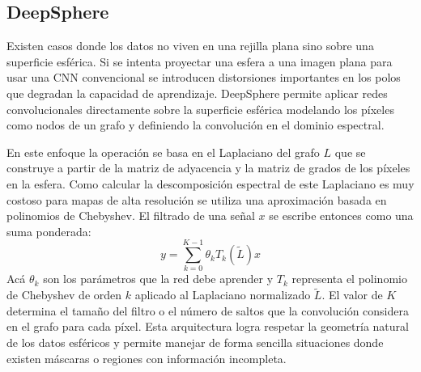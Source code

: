 \subsection{DeepSphere}
\label{subsec:deepsphere}

Existen casos donde los datos no viven en una rejilla plana sino sobre una superficie esférica. Si se intenta proyectar una esfera a una imagen plana para usar una CNN convencional se introducen distorsiones importantes en los polos que degradan la capacidad de aprendizaje. DeepSphere permite aplicar redes convolucionales directamente sobre la superficie esférica modelando los píxeles como nodos de un grafo y definiendo la convolución en el dominio espectral.

En este enfoque la operación se basa en el Laplaciano del grafo $L$ que se construye a partir de la matriz de adyacencia y la matriz de grados de los píxeles en la esfera. Como calcular la descomposición espectral de este Laplaciano es muy costoso para mapas de alta resolución se utiliza una aproximación basada en polinomios de Chebyshev. El filtrado de una señal $x$ se escribe entonces como una suma ponderada:
\begin{equation}
    y = \sum_{k=0}^{K-1} \theta_k T_k(\tilde{L})x
\end{equation}
Acá $\theta_k$ son los parámetros que la red debe aprender y $T_k$ representa el polinomio de Chebyshev de orden $k$ aplicado al Laplaciano normalizado $\tilde{L}$. El valor de $K$ determina el tamaño del filtro o el número de saltos que la convolución considera en el grafo para cada píxel. Esta arquitectura logra respetar la geometría natural de los datos esféricos y permite manejar de forma sencilla situaciones donde existen máscaras o regiones con información incompleta.


